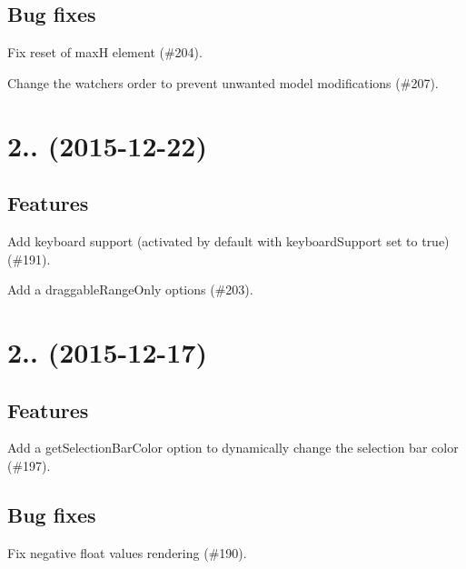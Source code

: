 \subsection*{Bug fixes}


\begin{DoxyItemize}
\item Fix reset of maxH element (\#204).
\item Change the watchers order to prevent unwanted model modifications (\#207).
\end{DoxyItemize}

\section*{2.. (2015-\/12-\/22)}

\subsection*{Features}


\begin{DoxyItemize}
\item Add keyboard support (activated by default with {\ttfamily keyboard\+Support} set to true) (\#191).
\item Add a {\ttfamily draggable\+Range\+Only} options (\#203).
\end{DoxyItemize}

\section*{2.. (2015-\/12-\/17)}

\subsection*{Features}


\begin{DoxyItemize}
\item Add a {\ttfamily get\+Selection\+Bar\+Color} option to dynamically change the selection bar color (\#197).
\end{DoxyItemize}

\subsection*{Bug fixes}


\begin{DoxyItemize}
\item Fix negative float values rendering (\#190).
\end{DoxyItemize}

